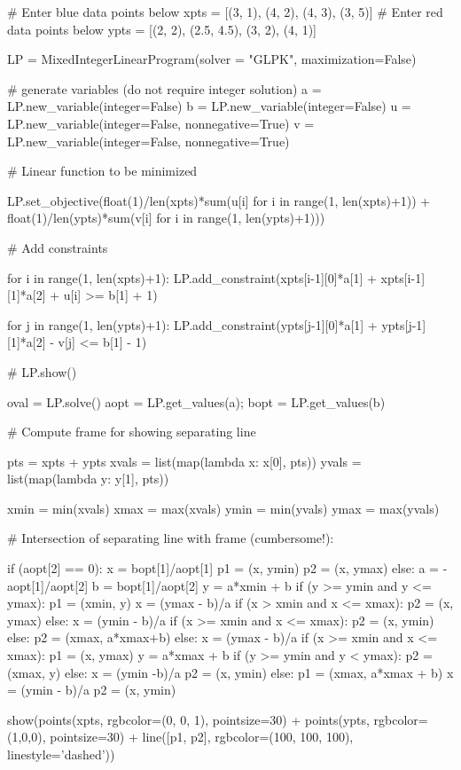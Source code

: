 \documentclass{article}
\begin{document}
\begin{sage}
# Enter blue data points below
xpts = [(3, 1), (4, 2), (4, 3), (3, 5)]
# Enter red data points below
ypts = [(2, 2), (2.5, 4.5), (3, 2), (4, 1)]

LP = MixedIntegerLinearProgram(solver = "GLPK", maximization=False)
 
# generate variables (do not require integer solution) 
a = LP.new_variable(integer=False)
b = LP.new_variable(integer=False)
u = LP.new_variable(integer=False, nonnegative=True)
v = LP.new_variable(integer=False, nonnegative=True)



# Linear function to be minimized

LP.set_objective(float(1)/len(xpts)*sum(u[i] for i in range(1, len(xpts)+1)) + float(1)/len(ypts)*sum(v[i] for i in range(1, len(ypts)+1)))
    
# Add constraints

for i in range(1, len(xpts)+1):
  LP.add_constraint(xpts[i-1][0]*a[1] + xpts[i-1][1]*a[2] + u[i] >= b[1] + 1)

for j in range(1, len(ypts)+1):
  LP.add_constraint(ypts[j-1][0]*a[1] + ypts[j-1][1]*a[2] - v[j] <= b[1] - 1)
 
# LP.show()
 
oval = LP.solve()
aopt = LP.get_values(a);
bopt = LP.get_values(b)

# Compute frame for showing separating line

pts = xpts + ypts
xvals = list(map(lambda x: x[0], pts))
yvals = list(map(lambda y: y[1], pts))

xmin = min(xvals)
xmax = max(xvals)
ymin = min(yvals)
ymax = max(yvals)


# Intersection of separating line with frame (cumbersome!):

if (aopt[2] == 0):
  x =  bopt[1]/aopt[1]
  p1 = (x, ymin)
  p2 = (x, ymax)
else:
  a = -aopt[1]/aopt[2]
  b = bopt[1]/aopt[2]
  y = a*xmin + b
  if (y >= ymin and y <= ymax):
    p1 = (xmin, y)
    x = (ymax - b)/a
    if (x > xmin and x <= xmax):
      p2 = (x, ymax)
    else:
      x = (ymin - b)/a  
      if (x >= xmin and x <= xmax):
        p2 = (x, ymin)
      else:
        p2 = (xmax, a*xmax+b)
  else:
    x = (ymax - b)/a
    if (x >= xmin and x <= xmax):
      p1 = (x, ymax)
      y = a*xmax + b
      if (y >= ymin and y < ymax):
        p2 = (xmax, y)
      else:
        x = (ymin -b)/a
        p2 = (x, ymin)
    else:
      p1 = (xmax, a*xmax + b)
      x = (ymin - b)/a
      p2 = (x, ymin)
      
show(points(xpts, rgbcolor=(0, 0, 1), pointsize=30) + points(ypts, rgbcolor=(1,0,0), pointsize=30) + line([p1, p2], rgbcolor=(100, 100, 100), linestyle='dashed')) 
\end{sage}
\end{document}

